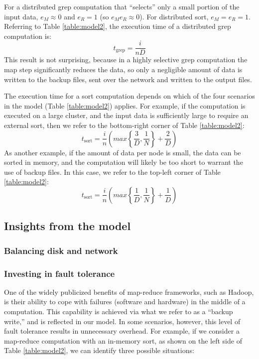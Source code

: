 \documentclass{acm_proc_article-sp}
\begin{document}
For a distributed grep computation that ``selects'' only a small portion of the input data, $e_M \approx 0$ and $e_R = 1$ (so $e_M e_R \approx 0$). For distributed sort, $e_M = e_R = 1$. Referring to Table \ref{table:model2}, the execution time of a distributed grep computation is:
\begin{equation}
t_\text{grep} = \frac{i}{n D}
\label{eqn:grepmodel}
\end{equation}
This result is not surprising, because in a highly selective grep computation the map step significantly reduces the data, so only a negligible amount of data is written to the backup files, sent over the network and written to the output files.

The execution time for a sort computation depends on which of the four scenarios in the model (Table \ref{table:model2}) applies. For example, if the computation is executed on a large cluster, and the input data is sufficiently large to require an external sort, then we refer to the bottom-right corner of Table \ref{table:model2}:
\begin{equation}
t_\text{sort} = \frac{i}{n} \left( max\left\{\frac{3}{D}, \frac{1}{N}\right\} + \frac{2}{D} \right)
\label{eqn:sortmodel1}
\end{equation}
As another example, if the amount of data per node is small, the data can be sorted in memory, and the computation will likely be too short to warrant the use of backup files. In this case, we refer to the top-left corner of Table \ref{table:model2}:
\begin{equation}
t_\text{sort} = \frac{i}{n} \left( max\left\{\frac{1}{D}, \frac{1}{N}\right\} + \frac{1}{D} \right)
\label{eqn:sortmodel2}
\end{equation}

\subsection{Insights from the model}

\subsubsection{Balancing disk and network}

\subsubsection{Investing in fault tolerance}

One of the widely publicized benefits of map-reduce frameworks, such as Hadoop, is their ability to cope with failures (software and hardware) in the middle of a computation. This capability is achieved via what we refer to as a ``backup write,'' and is reflected in our model. In some scenarios, however, this level of fault tolerance results in unnecessary overhead. For example, if we consider a map-reduce computation with an in-memory sort, as shown on the left side of Table \ref{table:model2}, we can identify three possible situations:
\end{document}
